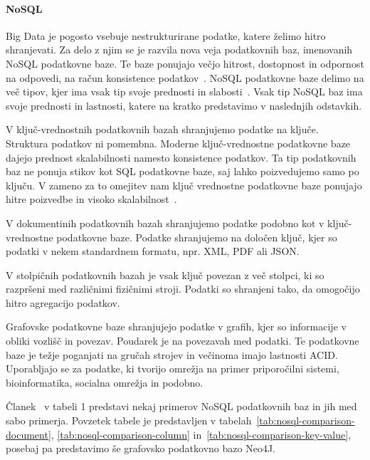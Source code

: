 \paragraph{NoSQL}
Big Data je pogosto vsebuje nestrukturirane podatke,
katere želimo hitro shranjevati.
Za delo z njim se je razvila nova veja podatkovnih baz,
imenovanih NoSQL podatkovne baze.
Te baze ponujajo večjo hitrost, dostopnost in odpornost na
odpovedi, na račun konsistence podatkov~\cite{nosql,perf_comp_sql_nosql}.
NoSQL podatkovne baze delimo na več tipov,
kjer ima vsak tip svoje prednosti in slabosti~\cite{nosql_types,nosql_survey}.
Vsak tip NoSQL baz ima svoje prednosti in lastnosti, katere na kratko predstavimo v naslednjih odstavkih.

V ključ-vrednostnih podatkovnih bazah shranjujemo podatke na ključe.
Struktura podatkov ni pomembna.
Moderne ključ-vrednostne podatkovne baze dajejo prednost
skalabilnosti namesto konsistence podatkov.
Ta tip podatkovnih baz ne ponuja stikov kot SQL podatkovne baze,
saj lahko poizvedujemo samo po ključu.
V zameno za to omejitev nam ključ vrednostne podatkovne baze ponujajo hitre
poizvedbe in visoko skalabilnost~\cite{nosql_types}.

V dokumentinih podatkovnih bazah shranjujemo
podatke podobno kot v ključ-vrednostne podatkovne baze.
Podatke shranjujemo na določen ključ,
kjer so podatki v nekem standardnem formatu, npr. XML, PDF ali JSON.

V stolpičnih podatkovnih bazah je vsak ključ povezan z več stolpci,
ki so razpršeni med različnimi fizičnimi stroji.
Podatki so shranjeni tako, da omogočijo hitro agregacijo podatkov.

Grafovske podatkovne baze shranjujejo podatke v grafih,
kjer so informacije v obliki vozlišč in povezav.
Poudarek je na povezavah med podatki.
Te podatkovne baze je težje poganjati na gručah strojev in
večinoma imajo lastnosti ACID.
Uporabljajo se za podatke, ki tvorijo omrežja na primer
priporočilni sistemi, bioinformatika, socialna omrežja in podobno.

Članek~\cite{nosql} v tabeli 1 predstavi nekaj primerov NoSQL podatkovnih baz in jih med
sabo primerja.
Povzetek tabele je predstavljen v tabelah~\ref{tab:nosql-comparison-document}, \ref{tab:nosql-comparison-column}
in~\ref{tab:nosql-comparison-key-value}, posebaj pa predstavimo še grafovsko podatkovno bazo Neo4J.

